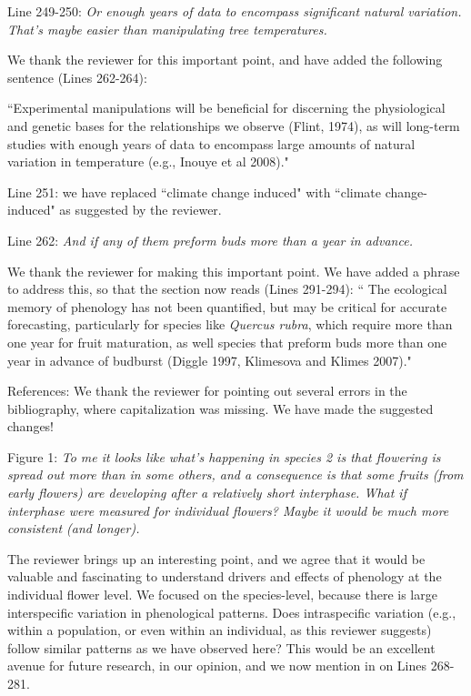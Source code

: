 \documentclass[10.95pt,a4paper]{letter}
\begin{document}
\par Line 249-250: \emph{Or enough years of data to encompass significant natural variation.  That's maybe easier than manipulating tree temperatures.}
\par We thank the reviewer for this important point, and have added the following sentence (Lines 262-264):
\par ``Experimental manipulations will be beneficial for discerning the physiological and genetic bases for the relationships we observe (Flint, 1974), as will long-term studies  with  enough  years  of  data  to  encompass  large  amounts  of  natural  variation  in  temperature  (e.g., Inouye et al 2008)."
\par Line 251: we have replaced ``climate change induced" with ``climate change-induced" as suggested by the reviewer.
\\
\par Line 262: \emph{And if any of them preform buds more than a year in advance.}
\par We thank the reviewer for making this important point. We have added a phrase to address this, so that the section now reads (Lines 291-294):
`` The ecological memory of phenology has not been quantified, but may be critical for accurate forecasting, particularly for species like \emph{Quercus rubra}, which require more than one year for fruit maturation, as well species that preform buds more than one year in advance of budburst (Diggle 1997, Klimesova and Klimes 2007)." 
\\
\par References: We thank the reviewer for pointing out several errors in the bibliography, where capitalization was missing. We have made the suggested changes!
\\
\par Figure 1: \emph{To me it looks like what's happening in species 2 is that flowering is spread out more than in some others, and a consequence is that some fruits (from early flowers) are developing after a relatively short interphase.  What if interphase were measured for individual flowers?  Maybe it would be much more consistent (and longer).}
\par The reviewer brings up an interesting point, and we agree that it would be valuable and fascinating to understand drivers and effects of phenology at the individual flower level. We focused on the species-level, because there is large interspecific variation in phenological patterns. Does intraspecific variation (e.g., within a population, or even within an individual, as this reviewer suggests) follow similar patterns as we have observed here? This would be an excellent avenue for future research, in our opinion, and we now mention in on Lines 268-281.
\end{document}
